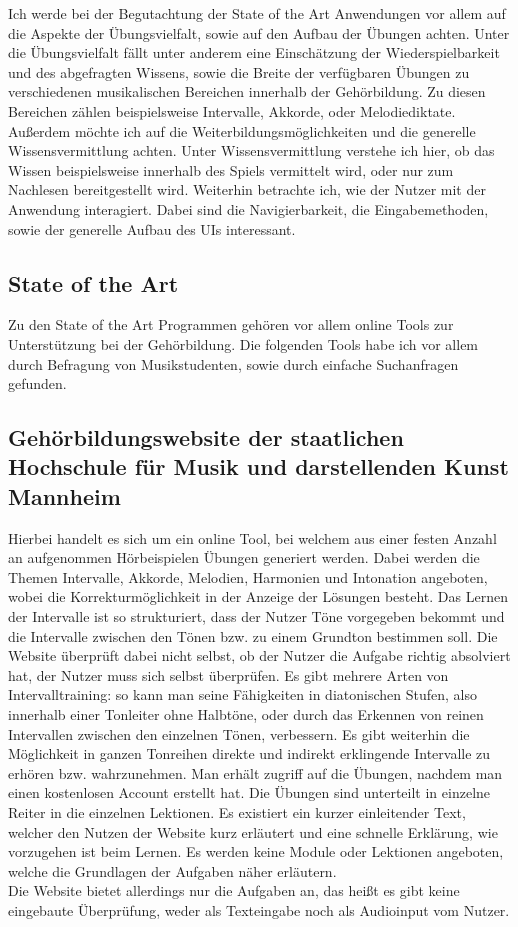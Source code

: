 Ich werde bei der Begutachtung der State of the Art Anwendungen vor allem auf die Aspekte der Übungsvielfalt, sowie auf den Aufbau der Übungen achten. Unter die Übungsvielfalt fällt unter anderem eine Einschätzung der Wiederspielbarkeit und des abgefragten Wissens, sowie die Breite der verfügbaren Übungen zu verschiedenen musikalischen Bereichen innerhalb der Gehörbildung. Zu diesen Bereichen zählen beispielsweise Intervalle, Akkorde, oder Melodiediktate.
Außerdem möchte ich auf die Weiterbildungsmöglichkeiten und die generelle Wissensvermittlung achten. Unter Wissensvermittlung verstehe ich hier, ob das Wissen beispielsweise innerhalb des Spiels vermittelt wird, oder nur zum Nachlesen bereitgestellt wird. 
Weiterhin betrachte ich, wie der Nutzer mit der Anwendung interagiert. Dabei sind die Navigierbarkeit, die Eingabemethoden, sowie der generelle Aufbau des UIs interessant. 

\subsection{State of the Art}

Zu den State of the Art Programmen gehören vor allem online Tools zur Unterstützung bei der Gehörbildung. Die folgenden Tools habe ich vor allem durch Befragung von Musikstudenten, sowie durch einfache Suchanfragen gefunden.

\subsection*{Gehörbildungswebsite der staatlichen Hochschule für Musik und darstellenden Kunst Mannheim}
\label{sec:Mannheim}
Hierbei handelt es sich um ein online Tool, bei welchem aus einer festen Anzahl an aufgenommen Hörbeispielen Übungen generiert werden.
Dabei werden die Themen Intervalle, Akkorde, Melodien, Harmonien und Intonation angeboten, wobei die Korrekturmöglichkeit in der Anzeige der Lösungen besteht. Das Lernen der Intervalle ist so strukturiert, dass der Nutzer Töne vorgegeben bekommt
und die Intervalle zwischen den Tönen bzw. zu einem Grundton bestimmen soll. Die Website überprüft dabei nicht selbst, ob der Nutzer die Aufgabe richtig absolviert hat, der Nutzer muss sich selbst überprüfen. 
Es gibt mehrere Arten von Intervalltraining: so kann man seine Fähigkeiten in diatonischen Stufen, also innerhalb einer Tonleiter ohne Halbtöne, oder durch das Erkennen von reinen Intervallen zwischen den einzelnen Tönen, verbessern. Es gibt weiterhin die Möglichkeit in ganzen Tonreihen
direkte und indirekt erklingende Intervalle zu erhören bzw. wahrzunehmen. Man erhält zugriff auf die Übungen, nachdem man einen kostenlosen Account 
erstellt hat. Die Übungen sind unterteilt in einzelne Reiter in die einzelnen Lektionen. Es existiert ein kurzer einleitender Text, welcher den Nutzen der Website kurz erläutert und eine schnelle Erklärung, wie vorzugehen ist beim Lernen. Es werden keine Module oder Lektionen angeboten, welche die Grundlagen der Aufgaben näher erläutern.\\
Die Website bietet allerdings nur die Aufgaben an, das heißt es gibt keine eingebaute Überprüfung, weder als Texteingabe noch als Audioinput vom Nutzer. \cite{hfmdk_mannheim}

